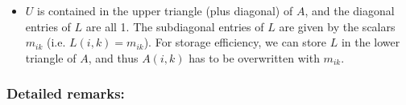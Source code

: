 \documentclass{scrartcl}
\newenvironment{mymdframed}[1]{%
\mdfsetup{%
frametitle={\colorbox{white}{\,#1\,}},
frametitleaboveskip=-\ht\strutbox,
frametitlealignment=\raggedright
}%
\begin{mdframed}[style=exampledefault]
}{\end{mdframed}}
\begin{document}
            \begin{itemize}
                \item $U$ is contained in the upper triangle (plus diagonal) of $A$, and the diagonal entries of $L$ are all 1. The subdiagonal entries of $L$ are given by the scalars $m_{ik}$ (i.e. $L(i,k) = m_{ik}$). For storage efficiency, we can store $L$ in the lower triangle of $A$, and thus $A(i,k)$ has to be overwritten with $m_{ik}$.
            \end{itemize}
    
    \subsubsection*{Detailed remarks:}
\end{document}
